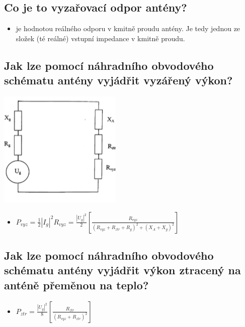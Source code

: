 \documentclass[a4paper,czech]{article}
\begin{document}
\subsection{\textbf{Co je to vyzařovací odpor antény?}}
\begin{itemize}
	\item je hodnotou reálného odporu v kmitně proudu antény. Je tedy jednou ze složek (té reálné) vstupní impedance v kmitně proudu.
\end{itemize}
\subsection{\textbf{Jak lze pomocí náhradního obvodového schématu antény vyjádřit vyzářený výkon?}}
\begin{center}
\includegraphics{images/ant_nahr.png}
\end{center}
\begin{itemize}
	\item $P_{vyz} = \frac{1}{2}|I_g|^2R_{vyz}=\frac{|U_g|^2}{2}[\frac{R_{vyz}}{(R_{vyz}+R_{ztr}+R_g)^2+(X_A+X_g)^2}]$
\end{itemize}
\subsection{\textbf{Jak lze pomocí náhradního obvodového schématu antény vyjádřit výkon ztracený na anténě přeměnou na teplo?}}
\begin{itemize}
	\item $P_{ztr} = \frac{|U_g|^2}{8}[\frac{R_{ztr}}{(R_{vyz}+R_{ztr})^2}]$
\end{itemize}
\end{document}
